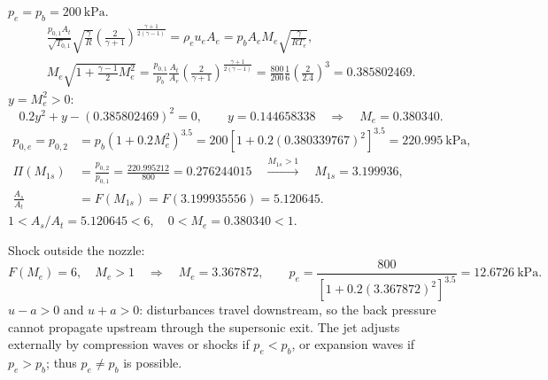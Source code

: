 $p_e=p_b=200~\mathrm{kPa}$.
\begin{gather*}
\frac{p_{0,1}A_t}{\sqrt{T_{0,1}}}\sqrt{\frac{\gamma}{R}}
\left(\frac{2}{\gamma+1}\right)^{\frac{\gamma+1}{2(\gamma-1)}}
=\rho_eu_eA_e=p_bA_eM_e\sqrt{\frac{\gamma}{RT_e}},\\
M_e\sqrt{1+\frac{\gamma-1}{2}M_e^2}
=\frac{p_{0,1}}{p_b}\frac{A_t}{A_e}
\left(\frac{2}{\gamma+1}\right)^{\frac{\gamma+1}{2(\gamma-1)}}
=\frac{800}{200}\frac{1}{6}\left(\frac{2}{2.4}\right)^3
=0.385802469.
\end{gather*}
$y=M_e^2>0$:
\[
0.2y^2+y-(0.385802469)^2=0,
\qquad y=0.144658338
\quad\Longrightarrow\quad \boxed{M_e=0.380340}.
\]
\begin{align*}
p_{0,e}=p_{0,2}&=p_b(1+0.2M_e^2)^{3.5}
=200[1+0.2(0.380339767)^2]^{3.5}
=\boxed{220.995~\mathrm{kPa}},\\
\Pi(M_{1s})&=\frac{p_{0,2}}{p_{0,1}}
=\frac{220.995212}{800}=0.276244015
\quad\xrightarrow{M_{1s}>1}\quad M_{1s}=3.199936,\\
\frac{A_s}{A_t}&=F(M_{1s})=F(3.199935556)=\boxed{5.120645}.
\end{align*}
$1<A_s/A_t=5.120645<6,\quad 0<M_e=0.380340<1$.

Shock outside the nozzle:
\[
F(M_e)=6,\quad M_e>1
\quad\Longrightarrow\quad M_e=3.367872,\qquad
p_e=\frac{800}{[1+0.2(3.367872)^2]^{3.5}}=12.6726~\mathrm{kPa}.
\]
$u-a>0$ and $u+a>0$: disturbances travel downstream, so the back pressure
cannot propagate upstream through the supersonic exit.
The jet adjusts externally by compression waves or shocks if $p_e<p_b$,
or expansion waves if $p_e>p_b$; thus $p_e\ne p_b$ is possible.
